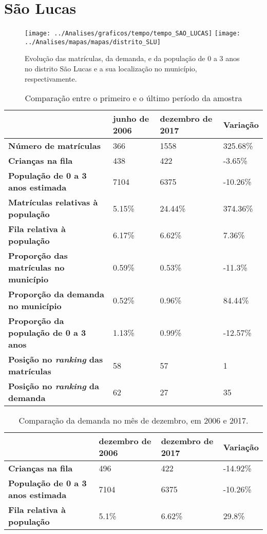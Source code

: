 \section{São Lucas}
\begin{figure}[H]
\centering
\texttt{[image: ../Analises/graficos/tempo/tempo\_SAO\_LUCAS]}
\texttt{[image: ../Analises/mapas/mapas/distrito\_SLU]}
\caption{Evolução das matrículas, da demanda, e da população de 0 a 3 anos no distrito São Lucas e a sua localização no município, respectivamente.}
\end{figure}
\begin{table}[H]
\begin{tabular}{l|l|l|l}
\textbf{}                                      & \textbf{junho de 2006}       & \textbf{dezembro de 2017}    & \textbf{Variação} \\ \hline
\textbf{Número de matrículas}                  & 366 & 1558 & 325.68\% \\ \hline
\textbf{Crianças na fila}                      & 438 & 422 & -3.65\% \\ \hline
\textbf{População de 0 a 3 anos estimada}      & 7104 & 6375 & -10.26\% \\ \hline
\textbf{Matrículas relativas à população}      & 5.15\% & 24.44\% & 374.36\% \\ \hline
\textbf{Fila relativa à população}             & 6.17\% & 6.62\% & 7.36\% \\ \hline
\textbf{Proporção das matrículas no município} & 0.59\% & 0.53\% & -11.3\% \\ \hline
\textbf{Proporção da demanda no município}     & 0.52\% & 0.96\% & 84.44\% \\ \hline
\textbf{Proporção da população de 0 a 3 anos}  & 1.13\% & 0.99\% & -12.57\% \\ \hline
\textbf{Posição no \textit{ranking} das matrículas}     & 58 & 57 & 1 \\ \hline
\textbf{Posição no \textit{ranking} da demanda}         & 62 & 27 & 35 \\ 
\end{tabular}
\caption{Comparação entre o primeiro e o último período da amostra}
\end{table}
\begin{table}[H]
\begin{tabular}{l|l|l|l}
\textbf{}                                 & \textbf{dezembro de 2006} & \textbf{dezembro de 2017} & \textbf{Variação} \\ \hline
\textbf{Crianças na fila}                      & 496 & 422 & -14.92\% \\ \hline
\textbf{População de 0 a 3 anos estimada}      & 7104 & 6375 & -10.26\% \\ \hline
\textbf{Fila relativa à população}             & 5.1\% & 6.62\% & 29.8\% \\
\end{tabular}
\caption{Comparação da demanda no mês de dezembro, em 2006 e 2017.}
\end{table}
